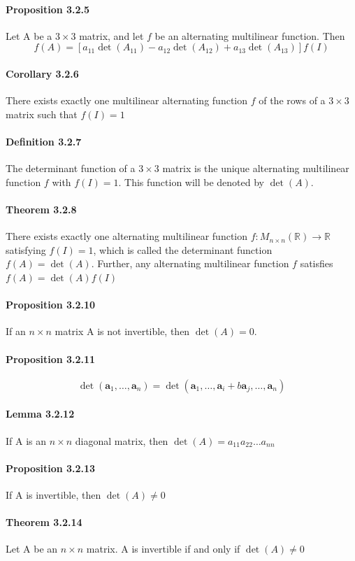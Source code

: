 \documentclass[11pt]{article}
\newcommand{\tb}[1]{\textbf{#1}}
\newcommand{\real}[0]{\mathbb{R}}
\newcommand{\va}[0]{\tb{a}}
\begin{document}
{\paragraph{Proposition 3.2.5} Let A be a $3 \times 3$ matrix, and let $f$ be an alternating multilinear function. Then
$$f(A) = [a_{11}\det(A_{11}) - a_{12}\det(A_{12}) + a_{13}\det(A_{13})]f(I)$$
\paragraph{Corollary 3.2.6} There exists exactly one multilinear alternating function $f$ of the rows of a $3 \times 3$ matrix such that $f(I) = 1$
\paragraph{Definition 3.2.7} The determinant function of a $3 \times 3$ matrix is the unique alternating multilinear function $f$ with $f(I) = 1$. This function will be denoted by $\det(A)$.
\paragraph{Theorem 3.2.8} There exists exactly one alternating multilinear function $f: M_{n\times n}(\real) \rightarrow \real$ satisfying $f(I) = 1$, which is called the determinant function $f(A) = \det(A)$. Further, any alternating multilinear function $f$ satisfies $f(A) = \det(A)f(I)$
\paragraph{Proposition 3.2.10} If an $n \times n$ matrix A is not invertible, then $\det(A) = 0$.
\paragraph{Proposition 3.2.11} $$\det(\va_1,\hdots,\va_n) = \det(\va_1,\hdots,\va_i + b\va_j, \hdots, \va_n)$$
\paragraph{Lemma 3.2.12} If A is an $n \times n$ diagonal matrix, then $\det(A) = a_{11}a_{22}\hdots a_{nn}$
\paragraph{Proposition 3.2.13} If A is invertible, then $\det(A) \neq 0$
\paragraph{Theorem 3.2.14} Let A be an $n\times n$ matrix. A is invertible if and only if $\det(A) \neq 0$
}
\end{document}

